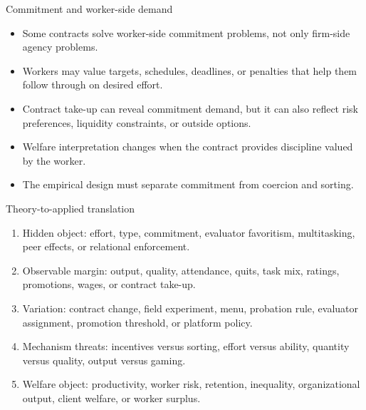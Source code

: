 \documentclass[aspectratio=169,11pt]{beamer}
\begin{document}
\begin{frame}{Commitment and worker-side demand}
\begin{itemize}
    \item Some contracts solve worker-side commitment problems, not only firm-side agency problems.
    \item Workers may value targets, schedules, deadlines, or penalties that help them follow through on desired effort.
    \item Contract take-up can reveal commitment demand, but it can also reflect risk preferences, liquidity constraints, or outside options.
    \item Welfare interpretation changes when the contract provides discipline valued by the worker.
    \item The empirical design must separate commitment from coercion and sorting.
\end{itemize}
\end{frame}

\begin{frame}{Theory-to-applied translation}
\small
\begin{enumerate}
    \item Hidden object: effort, type, commitment, evaluator favoritism, multitasking, peer effects, or relational enforcement.
    \item Observable margin: output, quality, attendance, quits, task mix, ratings, promotions, wages, or contract take-up.
    \item Variation: contract change, field experiment, menu, probation rule, evaluator assignment, promotion threshold, or platform policy.
    \item Mechanism threats: incentives versus sorting, effort versus ability, quantity versus quality, output versus gaming.
    \item Welfare object: productivity, worker risk, retention, inequality, organizational output, client welfare, or worker surplus.
\end{enumerate}
\end{frame}
\end{document}
